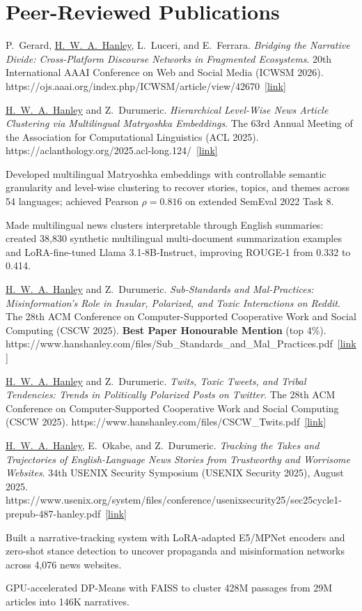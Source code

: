 \documentclass[11pt,letterpaper]{article}
\newcommand{\pub}[4]{%
  \Needspace{3\baselineskip}%
  \item #1. \textit{#2}. #3.%
  \ifx\relax#4\relax\else\ \href{#4}{\small[link]}\fi
}
\newcommand{\me}{\underline{H.~W.~A.~Hanley}}
\begin{document}
\section{Peer-Reviewed Publications}

\begin{pubs}

\pub{P.~Gerard, \me{}, L.~Luceri, and E.~Ferrara}
    {Bridging the Narrative Divide: Cross-Platform Discourse Networks in Fragmented Ecosystems}
    {20th International AAAI Conference on Web and Social Media (ICWSM 2026)}
    {https://ojs.aaai.org/index.php/ICWSM/article/view/42670}

\pub{\me{} and Z.~Durumeric}
    {Hierarchical Level-Wise News Article Clustering via Multilingual Matryoshka Embeddings}
    {The 63rd Annual Meeting of the Association for Computational Linguistics (ACL 2025)}
    {https://aclanthology.org/2025.acl-long.124/}
\begin{bullets}
  \item Developed multilingual Matryoshka embeddings with controllable semantic granularity and level-wise clustering to recover stories, topics, and themes across 54 languages; achieved Pearson $\rho=0.816$ on extended SemEval 2022 Task 8.
  \item Made multilingual news clusters interpretable through English summaries: created 38,830 synthetic multilingual multi-document summarization examples and LoRA-fine-tuned Llama 3.1-8B-Instruct, improving ROUGE-1 from 0.332 to 0.414.
\end{bullets}

\pub{\me{} and Z.~Durumeric}
    {Sub-Standards and Mal-Practices: Misinformation's Role in Insular, Polarized, and Toxic Interactions on Reddit}
    {The 28th ACM Conference on Computer-Supported Cooperative Work and Social Computing (CSCW 2025).
     \textbf{Best Paper Honourable Mention} (top 4\%)}
    {https://www.hanshanley.com/files/Sub_Standards_and_Mal_Practices.pdf}

\pub{\me{} and Z.~Durumeric}
    {Twits, Toxic Tweets, and Tribal Tendencies: Trends in Politically Polarized Posts on Twitter}
    {The 28th ACM Conference on Computer-Supported Cooperative Work and Social Computing (CSCW 2025)}
    {https://www.hanshanley.com/files/CSCW_Twits.pdf}

\pub{\me{}, E.~Okabe, and Z.~Durumeric}
    {Tracking the Takes and Trajectories of English-Language News Stories from Trustworthy and Worrisome Websites}
    {34th USENIX Security Symposium (USENIX Security 2025), August 2025}
    {https://www.usenix.org/system/files/conference/usenixsecurity25/sec25cycle1-prepub-487-hanley.pdf}
\begin{bullets}
  \item Built a narrative-tracking system with LoRA-adapted E5/MPNet encoders and zero-shot stance detection to uncover propaganda and misinformation networks across 4,076 news websites.
  \item GPU-accelerated DP-Means with FAISS to cluster 428M passages from 29M articles into 146K narratives.
\end{bullets}


\end{pubs}
\end{document}
